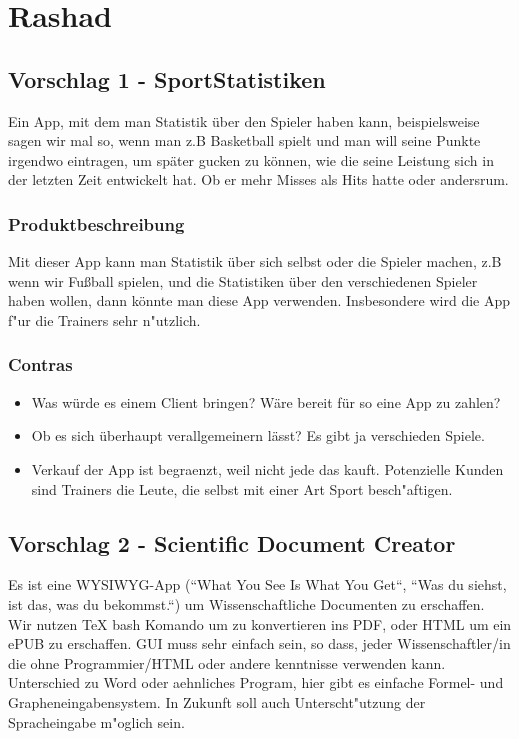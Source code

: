 \section{Rashad}

\subsection{Vorschlag 1 - SportStatistiken}
Ein App, mit dem man Statistik über den Spieler haben kann, beispielsweise sagen wir mal so, wenn man z.B Basketball spielt und man will seine Punkte irgendwo eintragen, um später gucken zu können, wie die seine Leistung sich in der letzten Zeit entwickelt hat. Ob er mehr Misses als Hits hatte oder andersrum. 


\subsubsection{Produktbeschreibung}
Mit dieser App kann man Statistik über sich selbst oder die Spieler machen, z.B wenn wir Fußball spielen, und die Statistiken über den verschiedenen Spieler haben wollen, dann könnte man diese App verwenden. Insbesondere wird die App f"ur die Trainers sehr n"utzlich.

\vspace{0.2cm}

\subsubsection{Contras}
\begin{itemize}
\item Was würde es einem Client bringen? Wäre bereit für so eine App zu zahlen?
\item Ob es sich überhaupt verallgemeinern lässt? Es gibt ja verschieden Spiele.
\item Verkauf der App ist begraenzt, weil nicht jede das kauft. Potenzielle Kunden sind Trainers die Leute, die selbst mit einer Art Sport besch"aftigen. 
\end{itemize}

\subsection{Vorschlag 2 - Scientific Document Creator}
Es ist eine WYSIWYG-App (``What You See Is What You Get``, ``Was du siehst, ist das, was du bekommst.``) um Wissenschaftliche Documenten zu erschaffen. Wir nutzen TeX bash Komando um zu konvertieren ins PDF, oder HTML um ein ePUB zu erschaffen. GUI muss sehr einfach sein, so dass, jeder Wissenschaftler/in die ohne Programmier/HTML oder andere kenntnisse verwenden kann. Unterschied zu Word oder aehnliches Program, hier gibt es einfache Formel- und Grapheneingabensystem. In Zukunft soll auch Unterscht"utzung der Spracheingabe m"oglich sein.

